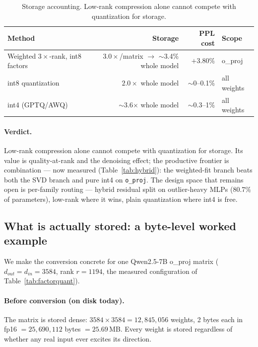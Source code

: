\documentclass[11pt]{article}
\begin{document}
\begin{table}[h]
\centering
\begin{tabular}{lrrl}
\toprule
Method & Storage & PPL cost & Scope \\
\midrule
Weighted $3\times$-rank, int8 factors & $3.0\times$/matrix $\to$ $\sim$3.4\% whole model & $+3.80\%$ & o\_proj \\
int8 quantization                     & $2.0\times$ whole model & $\sim$0--0.1\% & all weights \\
int4 (GPTQ/AWQ)                       & $\sim$3.6$\times$ whole model & $\sim$0.3--1\% & all weights \\
\bottomrule
\end{tabular}
\caption{Storage accounting. Low-rank compression alone cannot compete with
quantization for storage.}
\label{tab:storage}
\end{table}

\paragraph{Verdict.} Low-rank compression alone cannot compete with
quantization for storage. Its value is quality-at-rank and the denoising
effect; the productive frontier is combination --- now measured
(Table~\ref{tab:hybrid}): the weighted-fit branch beats both the SVD branch
and pure int4 on \texttt{o\_proj}. The design space that remains open is
per-family routing --- hybrid residual split on outlier-heavy MLPs (80.7\%
of parameters), low-rank where it wins, plain quantization where int4 is
free.

\subsection{What is actually stored: a byte-level worked example}\label{sec:bytes}

We make the conversion concrete for one Qwen2.5-7B o\_proj matrix
($d_{out} = d_{in} = 3584$, rank $r = 1194$, the measured configuration of
Table~\ref{tab:factorquant}).

\paragraph{Before conversion (on disk today).} The matrix is stored dense:
$3584 \times 3584 = 12{,}845{,}056$ weights, 2 bytes each in fp16
$= 25{,}690{,}112$ bytes $= 25.69$\,MB. Every weight is stored regardless of
whether any real input ever excites its direction.
\end{document}
